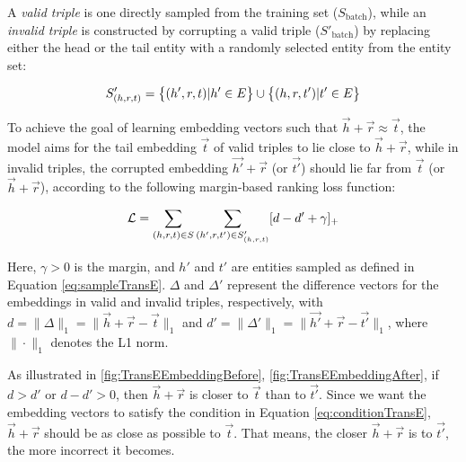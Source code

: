 A \textit{valid triple} is one directly sampled from the training set ($S_{\text{batch}}$), while an \textit{invalid triple} is constructed by corrupting a valid triple ($S'_{\text{batch}}$) by replacing either the head or the tail entity with a randomly selected entity from the entity set:

\begin{equation}
	\label{eq:sampleTransE}
	\centering
	S'_{(h, r, t)} = \big\{ (h', r, t) | h' \in E \big\} \cup \big\{ (h, r, t') | t' \in E \big\}
\end{equation}

To achieve the goal of learning embedding vectors such that $\overrightarrow{h} + \overrightarrow{r} \approx \overrightarrow{t}$, the model aims for the tail embedding $\overrightarrow{t}$ of valid triples to lie close to $\overrightarrow{h} + \overrightarrow{r}$, while in invalid triples, the corrupted embedding $\overrightarrow{h'} + \overrightarrow{r}$ (or $\overrightarrow{t'}$) should lie far from $\overrightarrow{t}$ (or $\overrightarrow{h} + \overrightarrow{r}$), according to the following margin-based ranking loss function:

\begin{equation}
	\label{eq:KBGATLoss}
	\centering
	\mathcal{L} = \sum_{(h, r, t) \in S} \sum_{(h', r, t') \in S'_{(h, r, t)}} [d - d' + \gamma]_{+}
\end{equation}



Here, $\gamma > 0$ is the margin, and $h'$ and $t'$ are entities sampled as defined in Equation \ref{eq:sampleTransE}. $\Delta$ and $\Delta'$ represent the difference vectors for the embeddings in valid and invalid triples, respectively, with $d = \big\|\Delta \big\|_{1} = \big\| \overrightarrow{h} + \overrightarrow{r} - \overrightarrow{t} \big\|_{1}$ and $d' = \big\|\Delta' \big\|_{1} = \big\| \overrightarrow{h'} + \overrightarrow{r} - \overrightarrow{t'} \big\|_{1}$, where $\|\cdot\|_{1}$ denotes the L1 norm.

As illustrated in \autoref{fig:TransEEmbeddingBefore}, \autoref{fig:TransEEmbeddingAfter}, if $d > d'$ or $d - d' > 0$, then $\overrightarrow{h} + \overrightarrow{r}$ is closer to $\overrightarrow{t}$ than to $\overrightarrow{t'}$. Since we want the embedding vectors to satisfy the condition in Equation \ref{eq:conditionTransE}, $\overrightarrow{h} + \overrightarrow{r}$ should be as close as possible to $\overrightarrow{t}$. That means, the closer $\overrightarrow{h} + \overrightarrow{r}$ is to $\overrightarrow{t'}$, the more incorrect it becomes.

